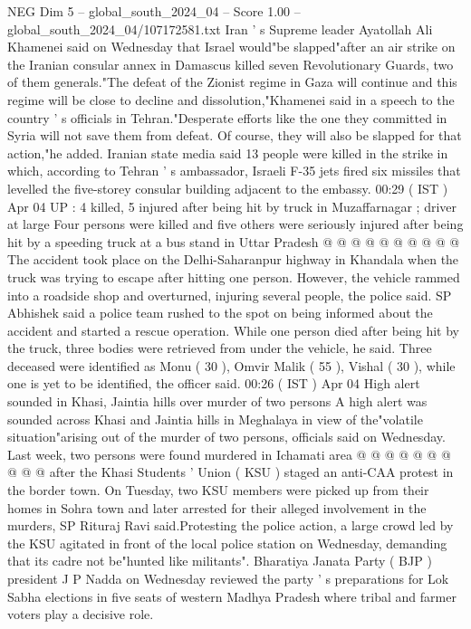 \begin{textsample}{NEG Dim 5 – global\_south\_2024\_04 – Score 1.00 – global\_south\_2024\_04/107172581.txt}  \label{ex:f5_neg_187}
Iran ' s Supreme leader Ayatollah Ali Khamenei said on Wednesday that Israel would"be slapped"after an air strike on the Iranian consular annex in Damascus killed seven Revolutionary Guards, two of them generals."The defeat of the Zionist regime in Gaza will continue and this regime will be close to decline and dissolution,"Khamenei said in a speech to the country ' s officials in Tehran."Desperate efforts like the one they committed in Syria will not save them from defeat.
Of course, they will also be slapped for that action,"he added.
Iranian state media said 13 people were killed in the strike in which, according to Tehran ' s ambassador, Israeli F-35 jets fired six missiles that levelled the five-storey consular building adjacent to the embassy. 00:29 ( IST ) Apr 04 UP : 4 killed, 5 injured after being hit by truck in Muzaffarnagar ; driver at large Four persons were killed and five others were seriously injured after being hit by a speeding truck at a bus stand in Uttar Pradesh @ @ @ @ @ @ @ @ @ @ The accident took place on the Delhi-Saharanpur highway in Khandala when the truck was trying to escape after hitting one person.
However, the vehicle rammed into a roadside shop and overturned, injuring several people, the police said.
SP Abhishek said a police team rushed to the spot on being informed about the accident and started a rescue operation.
While one person died after being hit by the truck, three bodies were retrieved from under the vehicle, he said.
Three deceased were identified as Monu ( 30 ), Omvir Malik ( 55 ), Vishal ( 30 ), while one is yet to be identified, the officer said. 00:26 ( IST ) Apr 04 High alert sounded in Khasi, Jaintia hills over murder of two persons A high alert was sounded across Khasi and Jaintia hills in Meghalaya in view of the"volatile situation"arising out of the murder of two persons, officials said on Wednesday.
Last week, two persons were found murdered in Ichamati area @ @ @ @ @ @ @ @ @ @ after the Khasi Students ' Union ( KSU ) staged an anti-CAA protest in the border town.
On Tuesday, two KSU members were picked up from their homes in Sohra town and later arrested for their alleged involvement in the murders, SP Rituraj Ravi said.Protesting the police action, a large crowd led by the KSU agitated in front of the local police station on Wednesday, demanding that its cadre not be"hunted like militants".
Bharatiya Janata Party ( BJP ) president J P Nadda on Wednesday reviewed the party ' s preparations for Lok Sabha elections in five seats of western Madhya Pradesh where tribal and farmer voters play a decisive role.

\end{textsample}
